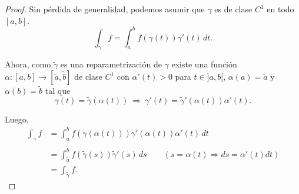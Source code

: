 \begin{proof}
Sin pérdida de generalidad, podemos asumir que $\gamma$ es de clase $C^1$ en todo $[a,b]$.
$$\int_{\gamma} f = \int_a^b f(\gamma(t)) \gamma'(t)\,dt.$$

Ahora, como $\tilde{\gamma}$ es una reparametrización de $\gamma$ existe una función $\alpha: [a,b] \longrightarrow [\tilde{a}, \tilde{b}]$ de clase $C^1$ con $\alpha'(t) > 0$ para $t\in ]a,b[$, $\alpha(a) = \tilde{a}$ y $\alpha(b) = \tilde{b}$ tal que 
$$\gamma(t) = \tilde{\gamma}(\alpha(t)) ~\Rightarrow~ \gamma'(t) = \tilde{\gamma}'(\alpha(t)) \alpha'(t).$$

Luego, 
\begin{align*}
\int_{\gamma} f &= \int_a^b f(\tilde{\gamma}(\alpha(t))) \tilde{\gamma}'(\alpha(t)) \alpha'(t) \,dt \\
&= \int_{\tilde{a}}^{\tilde{b}} f(\tilde{\gamma}(s)) \tilde{\gamma}'(s)\,ds \qquad (s = \alpha(t) \Rightarrow ds = \alpha'(t) dt) \\
&= \int_{\tilde{\gamma}} f.
\end{align*}
\end{proof}

